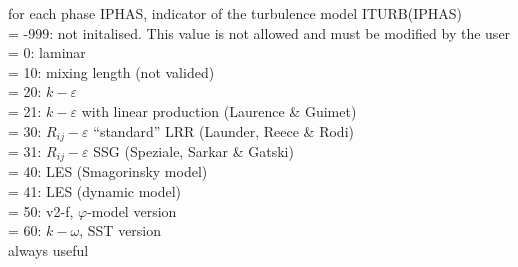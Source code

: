 {for each phase IPHAS, indicator of the turbulence model ITURB(IPHAS)\\
\hspace*{1.3cm}= -999: not initalised. This value is not allowed and
must be modified by the user\\
\hspace*{1.3cm}= 0: laminar\\
\hspace*{1.3cm}= 10: mixing length (not valided)\\
\hspace*{1.3cm}= 20: $k-\varepsilon$\\
\hspace*{1.3cm}= 21: $k-\varepsilon$ with linear production (Laurence \& Guimet)\\
\hspace*{1.3cm}= 30: $R_{ij}-\varepsilon$ ``standard'' LRR (Launder, Reece \& Rodi)\\
\hspace*{1.3cm}= 31: $R_{ij}-\varepsilon$ SSG (Speziale, Sarkar \& Gatski)\\
\hspace*{1.3cm}= 40: LES (Smagorinsky model) \\
\hspace*{1.3cm}= 41: LES (dynamic model) \\
\hspace*{1.3cm}= 50: v2-f, $\varphi$-model version\\
\hspace*{1.3cm}= 60: $k-\omega$, SST version \\
always useful}

